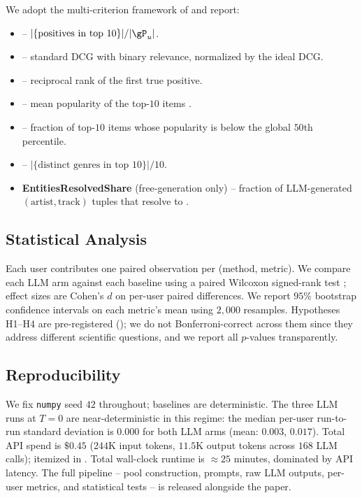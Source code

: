 We adopt the multi-criterion framework of \citet{epure2025music} and report:
\begin{itemize}[leftmargin=*,itemsep=0pt,topsep=0pt]
    \item \textbf{\recall} -- $|\{\text{positives in top 10}\}| / |\gP_u|$.
    \item \textbf{\ndcg} -- standard DCG with binary relevance, normalized by the ideal DCG.
    \item \textbf{\mrr} -- reciprocal rank of the first true positive.
    \item \textbf{\arp} -- mean \spotcat popularity of the top-$10$ items \citep{abdollahpouri2019popularity}.
    \item \textbf{\longtail} -- fraction of top-$10$ items whose popularity is below the global $50$th percentile.
    \item \textbf{\genrediv} -- $|\{\text{distinct genres in top 10}\}| / 10$.
    \item \textbf{EntitiesResolvedShare} (free-generation only) -- fraction of LLM-generated $(\text{artist}, \text{track})$ tuples that resolve to \spotcat.
\end{itemize}

\subsection{Statistical Analysis}
\label{sec:stats}

Each user contributes one paired observation per (method, metric). We compare each LLM arm against each baseline using a paired Wilcoxon signed-rank test \citep{wilcoxon1945individual}; effect sizes are Cohen's $d$ \citep{cohen1988statistical} on per-user paired differences. We report $95\%$ bootstrap confidence intervals on each metric's mean using $2{,}000$ resamples. Hypotheses H1--H4 are pre-registered (); we do not Bonferroni-correct across them since they address different scientific questions, and we report all $p$-values transparently.

\subsection{Reproducibility}
\label{sec:repro}

We fix \texttt{numpy} seed $42$ throughout; baselines are deterministic. The three LLM runs at $T{=}0$ are near-deterministic in this regime: the median per-user run-to-run \ndcg standard deviation is $0.000$ for both LLM arms (mean: \claude $0.003$, \gpt $0.017$). Total API spend is $\$0.45$ ($244$K input tokens, $11.5$K output tokens across $168$ LLM calls); itemized in . Total wall-clock runtime is $\approx 25$ minutes, dominated by API latency. The full pipeline -- pool construction, prompts, raw LLM outputs, per-user metrics, and statistical tests -- is released alongside the paper.
